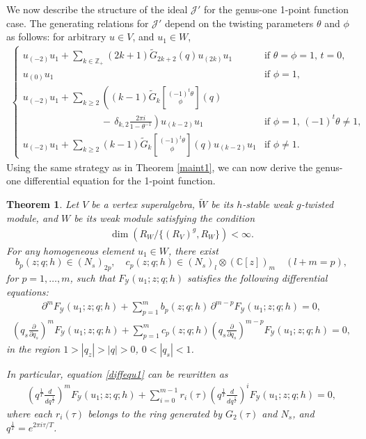 \documentclass[9pt]{amsart}
\newtheorem{theorem}{Theorem}[section]
\newcommand{\Z}{\mathbb{Z}}      %
\newcommand{\J}{\mathcal{J}}
\begin{document}
We now describe the structure of the ideal $\J'$ for the genus-one 1-point function case. The generating relations for $\J'$ depend on the twisting parameters $\theta$ and $\phi$ as follows: for arbitrary $u\in V$, and $u_1\in W$,  
\begin{align}\label{genus1Jrelations}
\begin{cases}
u_{(-2)} u_1 + \sum_{k\in \Z_+} (2k+1)\tilde{G}_{2k+2}(q) u_{(2k)} u_1 & \text{if } \theta = \phi = 1,\, t = 0, \\
u_{(0)} u_1 & \text{if } \phi = 1, \\
u_{(-2)} u_1 + \sum_{k \geq 2} \left(
(k - 1)\tilde{G}_{k}\genfrac[]{0pt}{0}{(-1)^{t}\theta}{\phi}(q)
\right. \\
\left.\hspace{8em} -\, \delta_{k,2} \frac{2\pi i}{1 - \theta^{-1}}\right)
u_{(k-2)} u_1 & \text{if } \phi = 1,\, (-1)^t \theta \neq 1, \\
u_{(-2)} u_1 + \sum_{k \geq 2} (k - 1) \tilde{G}_k\genfrac[]{0pt}{0}{(-1)^t \theta}{\phi}(q) u_{(k-2)} u_1 & \text{if } \phi \neq 1.
\end{cases}
\end{align}
Using the same strategy as in Theorem \ref{maint1}, we can now derive the genus-one differential equation for the 1-point function.
\begin{theorem}\label{1pointfun}
Let $V$ be a vertex superalgebra, $\tilde{W}$ be its $h$-stable weak $g$-twisted module, and $W$ be its weak module %
satisfying the condition
\begin{align}\label{6.15}
\operatorname{dim}\left(R_W/\{(R_V)^g, R_W\}\right) < \infty.
\end{align}
For any homogeneous element $u_1 \in W$, there exist
\[
b_p(z; q; h) \in (N_s)_{2p}, \quad
c_p(z; q; h) \in (N_s)_l \otimes (\mathbb{C}[z])_m \quad (l + m = p),
\]
for $p = 1, \dots, m$, such that $F_{\mathcal{Y}}(u_1; z; q; h)$ satisfies the following differential equations:
\begin{align}\label{diffequ1}
\partial^m F_{\mathcal{Y}}(u_1; z; q; h) + \sum_{p=1}^{m} b_p(z; q; h) \, \partial^{m-p} F_{\mathcal{Y}}(u_1; z; q; h) = 0,
\end{align}
\begin{align}\label{diffequi}
\left(q_s \frac{\partial}{\partial q_s}\right)^{m} F_{\mathcal{Y}}(u_1; z; q; h)
+ \sum_{p=1}^{m} c_p(z; q; h) \left(q_s \frac{\partial}{\partial q_s}\right)^{m-p} F_{\mathcal{Y}}(u_1; z; q; h) = 0,
\end{align}
in the region $1 > |q_z| > |q| > 0$, $0 < |q_s| < 1$.

In particular, equation \eqref{diffequ1} can be rewritten as
\begin{align}\label{diffequ12}
\left(q^{\frac{1}{T}} \frac{d}{d q^{\frac{1}{T}}} \right)^{m} F_{\mathcal{Y}}(u_1; z; q; h)
+ \sum_{i=0}^{m-1} r_i(\tau) \left(q^{\frac{1}{T}} \frac{d}{d q^{\frac{1}{T}}} \right)^{i} F_{\mathcal{Y}}(u_1; z; q; h) = 0,
\end{align}
where each $r_i(\tau)$ belongs to the ring generated by $G_2(\tau)$ and $N_s$, and $q^{\frac{1}{T}} = e^{2\pi i \tau/T}$.
\end{theorem}
\end{document}
